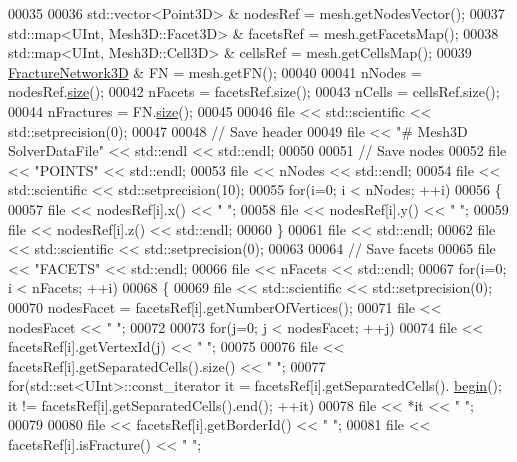 \begin{DoxyCode}
00035 
00036     std::vector<Point3D> & nodesRef = mesh.getNodesVector();
00037     std::map<UInt, Mesh3D::Facet3D> & facetsRef = mesh.getFacetsMap();
00038     std::map<UInt, Mesh3D::Cell3D> & cellsRef = mesh.getCellsMap();
00039     \hyperlink{classFVCode3D_1_1FractureNetwork3D}{FractureNetwork3D} & FN = mesh.getFN();
00040 
00041     nNodes = nodesRef.\hyperlink{classFVCode3D_1_1FractureNetwork3D_ab5c6a79673390ecf2edd54232993054c}{size}();
00042     nFacets = facetsRef.size();
00043     nCells = cellsRef.size();
00044     nFractures = FN.\hyperlink{classFVCode3D_1_1FractureNetwork3D_ab5c6a79673390ecf2edd54232993054c}{size}();
00045 
00046     file << std::scientific << std::setprecision(0);
00047 
00048     \textcolor{comment}{// Save header}
00049     file << \textcolor{stringliteral}{"# Mesh3D SolverDataFile"} << std::endl << std::endl;
00050 
00051     \textcolor{comment}{// Save nodes}
00052     file << \textcolor{stringliteral}{"POINTS"} << std::endl;
00053     file << nNodes << std::endl;
00054     file << std::scientific << std::setprecision(10);
00055     \textcolor{keywordflow}{for}(i=0; i < nNodes; ++i)
00056     \{
00057         file << nodesRef[i].x() << \textcolor{stringliteral}{" "};
00058         file << nodesRef[i].y() << \textcolor{stringliteral}{" "};
00059         file << nodesRef[i].z() << std::endl;
00060     \}
00061     file << std::endl;
00062     file << std::scientific << std::setprecision(0);
00063 
00064     \textcolor{comment}{// Save facets}
00065     file << \textcolor{stringliteral}{"FACETS"} << std::endl;
00066     file << nFacets << std::endl;
00067     \textcolor{keywordflow}{for}(i=0; i < nFacets; ++i)
00068     \{
00069         file << std::scientific << std::setprecision(0);
00070         nodesFacet = facetsRef[i].getNumberOfVertices();
00071         file << nodesFacet << \textcolor{stringliteral}{" "};
00072 
00073         \textcolor{keywordflow}{for}(j=0; j < nodesFacet; ++j)
00074             file << facetsRef[i].getVertexId(j) << \textcolor{stringliteral}{" "};
00075 
00076         file << facetsRef[i].getSeparatedCells().size() << \textcolor{stringliteral}{" "};
00077         \textcolor{keywordflow}{for}(std::set<UInt>::const\_iterator it = facetsRef[i].getSeparatedCells().
      \hyperlink{namespacestd_acec9a198880c12f51f02be95a298a48b}{begin}(); it != facetsRef[i].getSeparatedCells().end(); ++it)
00078             file << *it << \textcolor{stringliteral}{" "};
00079 
00080         file << facetsRef[i].getBorderId() << \textcolor{stringliteral}{" "};
00081         file << facetsRef[i].isFracture() << \textcolor{stringliteral}{" "};

\end{DoxyCode}
